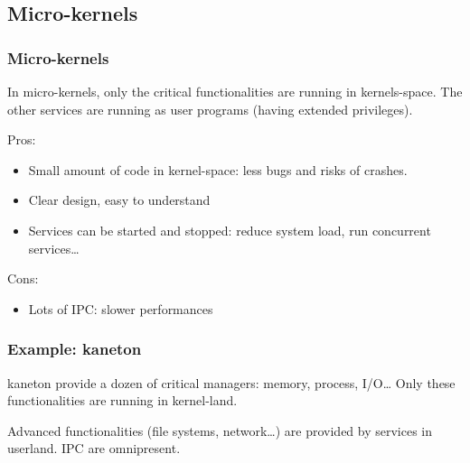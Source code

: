%
%

\subsection{Micro-kernels}

%
%

\begin{frame}
  \frametitle{Micro-kernels}

  In micro-kernels, only the critical functionalities are running in kernels-space. The other services are running as user programs (having extended privileges).

  \-

  Pros:

  \begin{itemize}
  \item
    Small amount of code in kernel-space: less bugs and risks of crashes.
  \item
    Clear design, easy to understand
  \item
    Services can be started and stopped: reduce system load, run concurrent services\ldots
  \end{itemize}

  \-

  Cons:

  \begin{itemize}
  \item
    Lots of IPC: slower performances
  \end{itemize}

\end{frame}

%
%

\begin{frame}
  \frametitle{Example: kaneton}

  kaneton provide a dozen of critical managers: memory, process,
  I/O\ldots{} Only these functionalities are running in kernel-land.

  \begin{center}
  \end{center}

  Advanced functionalities (file systems, network\ldots) are provided by services in userland. IPC are omnipresent.

\end{frame}

